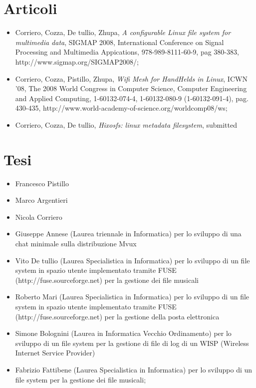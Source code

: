 \documentclass[a4paper,12pt]{article}
\begin{document}
\section*{Articoli}
\begin{itemize}
\item Corriero, Cozza, De tullio, Zhupa, \textit{A configurable Linux file system for multimedia data}, SIGMAP 2008, International Conference on Signal Processing and Multimedia Appications, 978-989-8111-60-9, pag 380-383, \\http://www.sigmap.org/SIGMAP2008/;
\item Corriero, Cozza, Pistillo, Zhupa, \textit{Wifi Mesh for HandHelds in Linux}, ICWN '08, The 2008 World Congress in Computer Science, Computer Engineering and Applied Computing, 1-60132-074-4, 1-60132-080-9 (1-60132-091-4), pag. 430-435, http://www.world-academy-of-science.org/worldcomp08/ws;
\item Corriero, Cozza, De tullio, \textit{Hixosfs: linux metadata filesystem}, submitted
\end{itemize}


\section*{Tesi}
\begin{itemize}
\item Francesco Pistillo
\item Marco Argentieri
\item Nicola Corriero
\item Giuseppe Annese (Laurea triennale in Informatica) per lo sviluppo di una chat minimale sulla distribuzione Mvux
\item Vito De tullio (Laurea Specialistica in Informatica) per lo sviluppo di un file system in spazio utente implementato tramite FUSE \\(http://fuse.sourceforge.net) per la gestione dei file musicali
\item Roberto Mari (Laurea Specialistica in Informatica) per lo sviluppo di un file system in spazio utente implementato tramite FUSE \\(http://fuse.sourceforge.net) per la gestione della posta elettronica
\item Simone Bolognini (Laurea in Informatica Vecchio Ordinamento) per lo sviluppo di un file system per la gestione di file di log di un WISP (Wireless Internet Service Provider)
\item Fabrizio Fattibene (Laurea Specialistica in Informatica) per lo sviluppo di un file system per la gestione dei file musicali;
\end{itemize}
\end{document}
